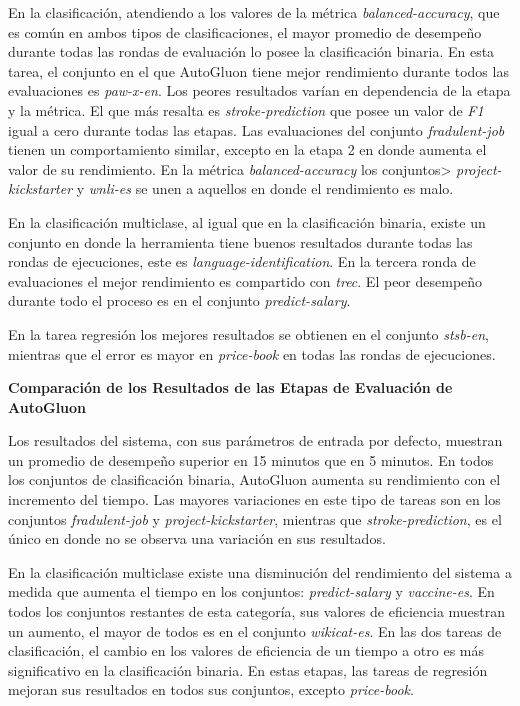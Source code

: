 En la clasificación, atendiendo a los valores de la métrica \textit{balanced-accuracy}, que es común en ambos tipos de clasificaciones, el mayor promedio de desempeño durante todas las rondas de 
evaluación lo posee la clasificación binaria.
En esta tarea, el conjunto en el que AutoGluon tiene mejor rendimiento durante todos las evaluaciones es \textit{paw-x-en}. Los peores resultados varían en dependencia de la etapa y la 
métrica. El que más resalta es \textit{stroke-prediction} que posee un valor de \textit{F1} igual a cero durante todas las etapas. Las evaluaciones del conjunto 
\textit{fradulent-job} tienen un comportamiento similar, excepto en la etapa 2 en donde aumenta el valor de su rendimiento. En la métrica \textit{balanced-accuracy} 
los conjuntos> \textit{project-kickstarter} y \textit{wnli-es} se unen a aquellos en donde el rendimiento es malo.

En la clasificación multiclase, al igual que en la clasificación binaria, existe un conjunto en donde la herramienta tiene buenos resultados durante todas las rondas de 
ejecuciones, este es \textit{language-identification}. En la tercera ronda de evaluaciones el mejor rendimiento es compartido con \textit{trec}. El peor desempeño 
durante todo el proceso es en el conjunto \textit{predict-salary}.

En la tarea regresión los mejores resultados se obtienen en el conjunto \textit{stsb-en}, mientras que el error es mayor en \textit{price-book} en todas las rondas 
de ejecuciones.


\begin{flushleft} 
  {\large { \textbf{Comparación de los Resultados de las Etapas de Evaluación de AutoGluon}}}\label{results:comparation}
\end{flushleft}

Los resultados del sistema, con sus parámetros de entrada por defecto, muestran un promedio de desempeño superior en 15 minutos que en 5 minutos. 
En todos los conjuntos de clasificación binaria, AutoGluon aumenta su rendimiento con el incremento del tiempo. 
Las mayores variaciones en este tipo de tareas son en los conjuntos \textit{fradulent-job} y \textit{project-kickstarter}, mientras que \textit{stroke-prediction}, 
es el único en donde no se observa una variación en sus resultados.

En la clasificación multiclase existe una disminución del rendimiento del sistema  a medida que aumenta el tiempo en los conjuntos: \textit{predict-salary} y 
\textit{vaccine-es}. En todos los conjuntos restantes de esta categoría, sus valores de eficiencia muestran un aumento, el mayor de todos es en el 
conjunto \textit{wikicat-es}.
En las dos tareas de clasificación, el cambio en los valores de eficiencia de un tiempo a otro es más significativo en la clasificación binaria.
En estas etapas, las tareas de regresión  mejoran sus resultados en todos sus conjuntos, excepto \textit{price-book}.

